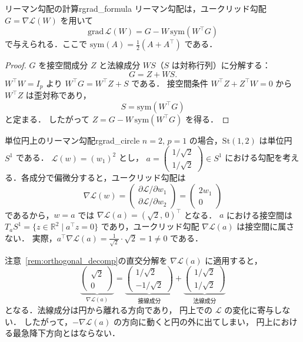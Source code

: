 \documentclass[uplatex, dvipdfmx]{jsarticle}
\begin{document}
\begin{proposition}{リーマン勾配の計算}{rgrad_formula}
リーマン勾配は，ユークリッド勾配 $G=\nabla \mathcal{L}(W)$ を用いて
\[
\mathrm{grad}\,\mathcal{L}(W)
=
G - W\,\mathrm{sym}(W^\top G)
\]
で与えられる．ここで $\mathrm{sym}(A)=\tfrac{1}{2}(A+A^\top)$ である．
\end{proposition}

\begin{proof}
$G$ を接空間成分 $Z$ と法線成分 $WS$（$S$ は対称行列）に分解する：
\[
G=Z+WS.
\]
$W^\top W=I_p$ より $W^\top G = W^\top Z + S$ である．
接空間条件 $W^\top Z + Z^\top W=0$ から
$W^\top Z$ は歪対称であり，
\[
S
= \mathrm{sym}(W^\top G)
\]
と定まる．
したがって $Z=G-W\,\mathrm{sym}(W^\top G)$ を得る．
\end{proof}

\begin{example}{単位円上のリーマン勾配}{rgrad_circle}
$n=2,\, p=1$ の場合，$\mathrm{St}(1,2)$ は単位円 $S^1$ である．
$\mathcal{L}(w)=(w_1)^2$ とし，
$a=\begin{pmatrix}1/\sqrt{2}\\1/\sqrt{2}\end{pmatrix}\in S^1$
における勾配を考える．各成分で偏微分すると，ユークリッド勾配は
\[
\nabla \mathcal{L}(w)
=\begin{pmatrix}\partial \mathcal{L}/\partial w_1\\\partial \mathcal{L}/\partial w_2\end{pmatrix}
=\begin{pmatrix}2w_1\\0\end{pmatrix}
\]
であるから，$w=a$ では
$\nabla \mathcal{L}(a)=(\sqrt{2},\,0)^\top$ となる．
$a$ における接空間は
$T_{a} S^1 = \{z\in\mathbb{R}^2 \mid a^\top z = 0\}$
であり，ユークリッド勾配 $\nabla \mathcal{L}(a)$ は接空間に属さない．
実際，$a^\top \nabla \mathcal{L}(a) = \frac{1}{\sqrt{2}}\cdot\sqrt{2} = 1 \neq 0$ である．

注意~\ref{rem:orthogonal_decomp}の直交分解を
$\nabla \mathcal{L}(a)$ に適用すると，
\[
\underbrace{\begin{pmatrix}\sqrt{2}\\0\end{pmatrix}}_{\nabla \mathcal{L}(a)}
=
\underbrace{\begin{pmatrix}1/\sqrt{2}\\-1/\sqrt{2}\end{pmatrix}}_{\text{接線成分}}
+
\underbrace{\begin{pmatrix}1/\sqrt{2}\\1/\sqrt{2}\end{pmatrix}}_{\text{法線成分}}
\]
となる．法線成分は円から離れる方向であり，
円上での $\mathcal{L}$ の変化に寄与しない．
したがって，$-\nabla \mathcal{L}(a)$ の方向に動くと円の外に出てしまい，
円上における最急降下方向とはならない．


\end{example}
\end{document}
